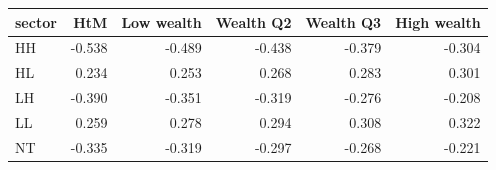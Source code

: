 \begin{tabular}{lrrrrr}
\toprule
sector & HtM & Low wealth & Wealth Q2 & Wealth Q3 & High wealth \\
\midrule
HH & -0.538 & -0.489 & -0.438 & -0.379 & -0.304 \\
HL & 0.234 & 0.253 & 0.268 & 0.283 & 0.301 \\
LH & -0.390 & -0.351 & -0.319 & -0.276 & -0.208 \\
LL & 0.259 & 0.278 & 0.294 & 0.308 & 0.322 \\
NT & -0.335 & -0.319 & -0.297 & -0.268 & -0.221 \\
\bottomrule
\end{tabular}
